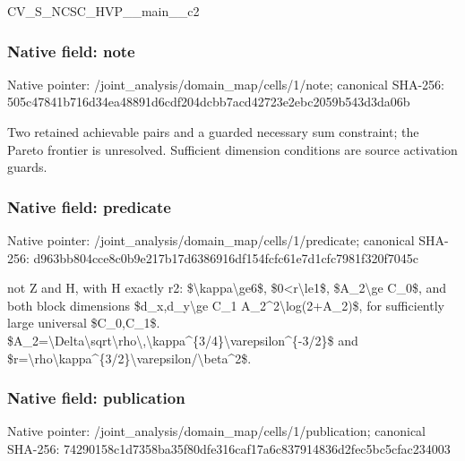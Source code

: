 \documentclass[10pt,a4paper]{article}
\begin{document}
\begingroup\raggedright\sloppy CV\_\allowbreak{}S\_\allowbreak{}NCSC\_\allowbreak{}HVP\_\allowbreak{}\_\allowbreak{}main\_\allowbreak{}\_\allowbreak{}c2\par\endgroup

\subsubsection{Native field: note}
Native pointer: /joint\_\allowbreak{}analysis/domain\_\allowbreak{}map/cells/1/note; canonical SHA-256: 505c47841b716d34ea48891d6cdf204dcbb7acd42723e2ebc2059b543d3da06b

\begingroup\raggedright\sloppy Two retained achievable pairs and a guarded necessary sum constraint;\allowbreak{} the Pareto frontier is unresolved. Sufficient dimension conditions are source activation guards.\par\endgroup

\subsubsection{Native field: predicate}
Native pointer: /joint\_\allowbreak{}analysis/domain\_\allowbreak{}map/cells/1/predicate; canonical SHA-256: d963bb804cce8c0b9e217b17d6386916df154fcfc61e7d1cfc7981f320f7045c

\begingroup\raggedright\sloppy not Z and H,\allowbreak{} with H exactly r2:\allowbreak{} \$\textbackslash{}kappa\textbackslash{}ge6\$,\allowbreak{} \$0<r\textbackslash{}le1\$,\allowbreak{} \$A\_\allowbreak{}2\textbackslash{}ge C\_\allowbreak{}0\$,\allowbreak{} and both block dimensions \$d\_\allowbreak{}x,\allowbreak{}d\_\allowbreak{}y\textbackslash{}ge C\_\allowbreak{}1 A\_\allowbreak{}2\textasciicircum{}2\textbackslash{}log(2+A\_\allowbreak{}2)\$,\allowbreak{} for sufficiently large universal \$C\_\allowbreak{}0,\allowbreak{}C\_\allowbreak{}1\$. \$A\_\allowbreak{}2=\allowbreak{}\textbackslash{}Delta\textbackslash{}sqrt\textbackslash{}rho\textbackslash{},\allowbreak{}\textbackslash{}kappa\textasciicircum{}\{3/\allowbreak{}4\}\textbackslash{}varepsilon\textasciicircum{}\{-3/\allowbreak{}2\}\$ and \$r=\allowbreak{}\textbackslash{}rho\textbackslash{}kappa\textasciicircum{}\{3/\allowbreak{}2\}\textbackslash{}varepsilon/\allowbreak{}\textbackslash{}beta\textasciicircum{}2\$.\par\endgroup

\subsubsection{Native field: publication}
Native pointer: /joint\_\allowbreak{}analysis/domain\_\allowbreak{}map/cells/1/publication; canonical SHA-256: 74290158c1d7358ba35f80dfe316caf17a6c837914836d2fec5bc5cfac234003
\end{document}
